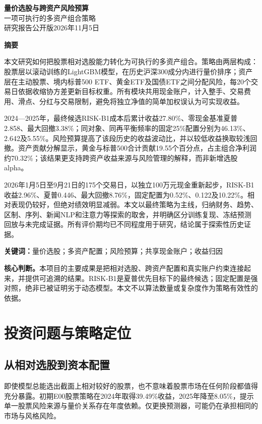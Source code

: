 \documentclass[11pt,a4paper]{article}
\begin{document}
\thispagestyle{plain}
\begin{center}
 {\LARGE\bfseries\color{ink}量价选股与跨资产风险预算}\\[.7em]
 {\large 一项可执行的多资产组合策略}\\[.8em]
 {\small 研究报告公开版\quad 2026年11月5日}
\end{center}
\vspace{.4em}
\begin{center}\textbf{摘要}\end{center}
本文研究如何把股票相对选股能力转化为可执行的多资产组合。策略由两层构成：股票层以滚动训练的LightGBM模型，在历史沪深300成分内进行量价排序；资产层在主动股票、境内标普500 ETF、黄金ETF及国债ETF之间分配风险，每20个交易日依据收缩协方差更新目标权重。所有模块共用现金账户，计入整手、交易费用、滑点、分红与交易限制，避免将独立净值的简单加权误认为可实现收益。

2024—2025年，最终候选RISK-B1成本后累计收益27.80\%、零现金基准夏普2.858、最大回撤3.38\%；同对象、同再平衡频率的固定25\%配置分别为46.13\%、2.642及5.55\%。风险预算提高了该段历史的收益波动比，并以较低收益换取较浅回撤。资产贡献分解显示，黄金与标普500合计贡献19.55个百分点，占主组合净利润约70.32\%；该结果更支持跨资产收益来源与风险管理的解释，而非新增选股alpha。

2026年1月5日至9月21日的175个交易日，以独立100万元现金重新起步，RISK-B1收益2.96\%、夏普0.446、最大回撤8.76\%，固定配置为0.52\%、0.122及10.22\%。相对表现仍较好，但绝对绩效明显减弱。本文以最终策略为主线，归纳财务、趋势、区制、序列、新闻NLP和注意力等探索的取舍，并明确区分训练复现、冻结预测回放与未完成证据。所有评价期均已不同程度用于研究，结论属于探索性历史证据。

\noindent\textbf{关键词：}量价选股；多资产配置；风险预算；共享现金账户；收益归因

\vspace{.5em}
\noindent\textbf{核心判断。}本项目的主要成果是把相对选股、跨资产配置和真实账户约束连接起来，并提供可追溯的结果。RISK-B1是夏普优先目标下的最终候选；固定配置是强对照，绝非已被证明劣于动态模型。本文不以算法数量或复杂度作为策略有效性的依据。

\clearpage
\section{投资问题与策略定位}
\subsection{从相对选股到资本配置}
即使模型总能选出截面上相对较好的股票，也不意味着股票市场在任何阶段都值得充分暴露。初期E00股票策略在2024年取得39.49\%收益，2025年降至8.05\%，提示单一股票风险来源与量价关系存在年度依赖。仅更换预测器，可能仍在承担相同的市场与风格风险。
\end{document}
